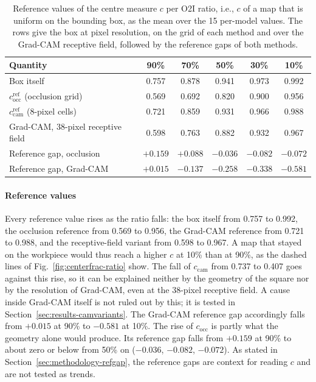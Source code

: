 \begin{table}[htbp]
\centering
\caption[Reference values of $c$ per ratio]{Reference values of the centre measure $c$
per O2I ratio, i.e., $c$ of a map that is uniform on the bounding box, as the mean over
the 15 per-model values. The rows give the box at pixel resolution, on the grid of each
method and over the Grad-CAM receptive field, followed by the reference gaps of both
methods.}
\label{tab:reference}
\small
\begin{tabular}{lccccc}
\toprule
Quantity & 90\% & 70\% & 50\% & 30\% &
10\% \\
\midrule
Box itself                                   & 0.757 & 0.878 & 0.941 & 0.973 & 0.992 \\
$c^{\mathrm{ref}}_{\mathrm{occ}}$ (occlusion grid) & 0.569 & 0.692 & 0.820 & 0.900 & 0.956 \\
$c^{\mathrm{ref}}_{\mathrm{cam}}$ (8-pixel cells)  & 0.721 & 0.859 & 0.931 & 0.966 & 0.988 \\
Grad-CAM, 38-pixel receptive field           & 0.598 & 0.763 & 0.882 & 0.932 & 0.967 \\
\midrule
Reference gap, occlusion & $+0.159$ & $+0.088$ & $-0.036$ & $-0.082$ & $-0.072$ \\
Reference gap, Grad-CAM  & $+0.015$ & $-0.137$ & $-0.258$ & $-0.338$ & $-0.581$ \\
\bottomrule
\end{tabular}
\end{table}

\paragraph{Reference values}
Every reference value rises as the ratio falls: the box itself from 0.757 to 0.992,
the occlusion reference from 0.569 to 0.956, the Grad-CAM reference from 0.721 to
0.988, and the receptive-field variant from 0.598 to 0.967. A map that stayed on the
workpiece would thus reach a higher $c$ at 10\% than at 90\%, as the dashed lines of
Fig.~\ref{fig:centerfrac-ratio} show. The fall of
$c_{\mathrm{cam}}$ from 0.737 to 0.407 goes against this rise, so it can be
explained neither by the geometry of the square nor by the resolution of Grad-CAM,
even at the 38-pixel receptive field. A cause inside Grad-CAM itself is not ruled out by
this; it is tested in Section~\ref{sec:results-camvariants}. The Grad-CAM reference gap accordingly falls from $+0.015$ at
90\% to $-0.581$ at 10\%. The rise of $c_{\mathrm{occ}}$ is partly what the geometry
alone would produce. Its reference gap falls from $+0.159$ at 90\% to about zero or
below from 50\% on ($-0.036$, $-0.082$, $-0.072$). As stated in
Section~\ref{sec:methodology-refgap}, the reference gaps are context for reading $c$
and are not tested as trends.

